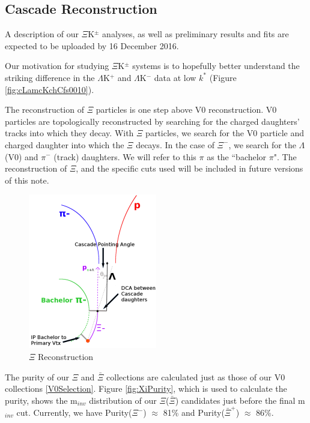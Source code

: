 \documentclass[../AnalysisNoteJBuxton.tex]{subfiles}
\begin{document}
\subsection{Cascade Reconstruction}
\label{CascadeReconstruction}

A description of our $\Xi$K$^{\pm}$ analyses, as well as preliminary results and fits are expected to be uploaded by 16 December 2016.

Our motivation for studying $\Xi$K$^{\pm}$ systems is to hopefully better understand the striking difference in the $\Lambda$K$^{+}$ and $\Lambda$K$^{-}$ data at low $k^{*}$ (Figure \ref{fig:cLamcKchCfs0010}).

The reconstruction of $\Xi$ particles is one step above V0 reconstruction.  V0 particles are topologically reconstructed by searching for the charged daughters' tracks into which they decay.  With $\Xi$ particles, we search for the V0 particle and charged daughter into which the $\Xi$ decays.  In the case of $\Xi^{-}$, we search for the $\Lambda$ (V0) and $\pi^{-}$ (track) daughters.  We will refer to this $\pi$ as the ``bachelor $\pi$".  The reconstruction of $\Xi$, and the specific cuts used will be included in future versions of this note.

\begin{figure}[h]
  \centering
  \includegraphics[width=0.5\textwidth]{3_DataSelection/Figures/XiCuts.pdf}
  \caption[$\Xi$ Reconstruction]{$\Xi$ Reconstruction}
  \label{fig:XiReconstruction}
\end{figure}

The purity of our $\Xi$ and $\bar{\Xi}$ collections are calculated just as those of our V0 collections \ref{V0Selection}.
Figure \ref{fig:XiPurity}, which is used to calculate the purity, shows the m$_{inv}$ distribution of our $\Xi$($\bar{\Xi}$) candidates just before the final m$_{inv}$ cut.  Currently, we have Purity($\Xi^{-}$) $\approx$ 81\% and Purity($\bar{\Xi}^{+}$) $\approx$ 86\%.
\end{document}
